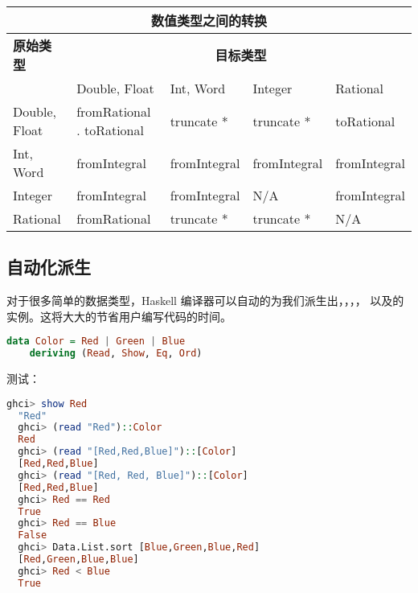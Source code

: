 \documentclass[./main.tex]{subfiles}
\begin{document}
\begin{center}
  \begin{tabular}{|l|l|l|l|l|}
    \hline
    \multicolumn{5}{|c|}{\textbf{数值类型之间的转换}}                                                         \\
    \hline
    \textbf{原始类型} & \multicolumn{4}{|c|}{\textbf{目标类型}}                                              \\
    \hline
                  & Double, Float                       & Int, Word    & Integer      & Rational     \\
    \hline
    Double, Float & fromRational . toRational           & truncate *   & truncate *   & toRational   \\
    Int, Word     & fromIntegral                        & fromIntegral & fromIntegral & fromIntegral \\
    Integer       & fromIntegral                        & fromIntegral & N/A          & fromIntegral \\
    Rational      & fromRational                        & truncate *   & truncate *   & N/A          \\
    \hline
  \end{tabular}
\end{center}

\subsection*{自动化派生}

对于很多简单的数据类型，Haskell 编译器可以自动的为我们派生出，，，，
以及的实例。这将大大的节省用户编写代码的时间。

\begin{lstlisting}[language=Haskell]
  data Color = Red | Green | Blue
    deriving (Read, Show, Eq, Ord)
\end{lstlisting}

测试：

\begin{lstlisting}[language=Haskell]
  ghci> show Red
  "Red"
  ghci> (read "Red")::Color
  Red
  ghci> (read "[Red,Red,Blue]")::[Color]
  [Red,Red,Blue]
  ghci> (read "[Red, Red, Blue]")::[Color]
  [Red,Red,Blue]
  ghci> Red == Red
  True
  ghci> Red == Blue
  False
  ghci> Data.List.sort [Blue,Green,Blue,Red]
  [Red,Green,Blue,Blue]
  ghci> Red < Blue
  True
\end{lstlisting}
\end{document}
